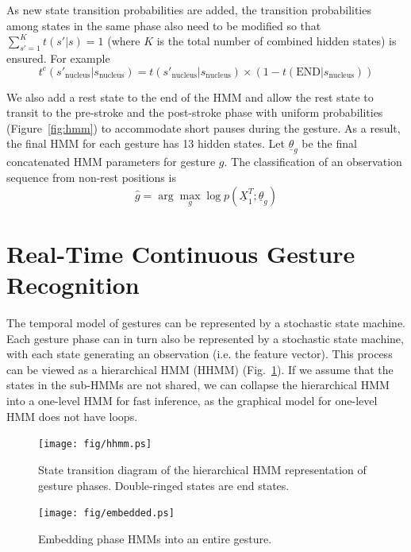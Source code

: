 As new state transition probabilities are added, the transition probabilities among
states in the same phase also need to be modified so that $\sum_{s' = 1}^K t(s'|s) = 1$ (where
$K$ is the total number of combined hidden states) is ensured. For example
\begin{displaymath}
t^c(s'_{\text{nucleus}} | s_{\text{nucleus}}) = t(s'_{\text{nucleus}} | s_{\text{nucleus}})
  \times (1 - t(\text{END} | s_{\text{nucleus}}))
\end{displaymath}

We also add a rest state to the end of the HMM and allow the rest state to transit to the pre-stroke
and the post-stroke phase with uniform probabilities (Figure~\ref{fig:hmm}) to accommodate short pauses during the gesture.
As a result, the final HMM for each gesture has 13 hidden states.
Let $\underline{\theta}_g$ be the final concatenated HMM parameters for gesture $g$. The classification
of an observation sequence from non-rest positions is 
\begin{displaymath}
\hat{g} = \arg\max_g\log p(\underline{X}_1^T; \underline{\theta}_g)
\end{displaymath}


\section{Real-Time Continuous Gesture Recognition}
The temporal model of gestures can be represented by a stochastic state machine.
Each gesture phase can in turn also be represented by a stochastic state
machine, with each state generating an observation (i.e. the feature vector).
This process can be viewed as a hierarchical HMM (HHMM) (Fig.~\ref{fig:hhmm}). If we assume
that the states in the sub-HMMs are not shared, we can collapse the hierarchical HMM
into a one-level HMM for fast inference, as the graphical model for one-level
HMM does not have loops.

\begin{figure}[!t]
\centering
\texttt{[image: fig/hhmm.ps]}
\caption{State transition diagram of the hierarchical HMM representation of
gesture phases. Double-ringed states are end states.}
\label{fig:hhmm}
\end{figure}

\begin{figure}[!t]
\centering
\texttt{[image: fig/embedded.ps]}
\caption{Embedding phase HMMs into an entire gesture.}
\label{fig:embed}
\end{figure}

